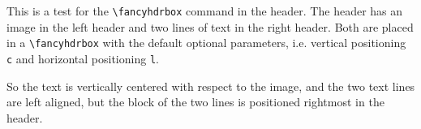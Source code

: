 \documentclass{article}
\begin{document}
This is a test for the \verb|\fancyhdrbox| command in the header. The header has an image in the left header and two lines of text in the right header. Both are placed in a \verb|\fancyhdrbox| with the default optional parameters, i.e. vertical positioning \texttt{c} and horizontal positioning \texttt{l}.

So the text is vertically centered with respect to the image, and the two text lines are left aligned, but the block of the two lines is positioned rightmost in the header.

\bigskip

\lipsum
\end{document}
